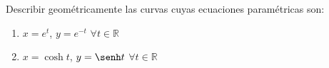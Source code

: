 \begin{ejercicio}
Describir geométricamente las curvas cuyas ecuaciones paramétricas son:
\begin{enumerate}
    \item \( x = e^t \), \( y = e^{-t} \) \qquad \( \forall t \in \mathbb{R} \)
    \item \( x = \cosh t \), \( y = \senh t \) \qquad \( \forall t \in \mathbb{R} \)
\end{enumerate}
\end{ejercicio}
    
